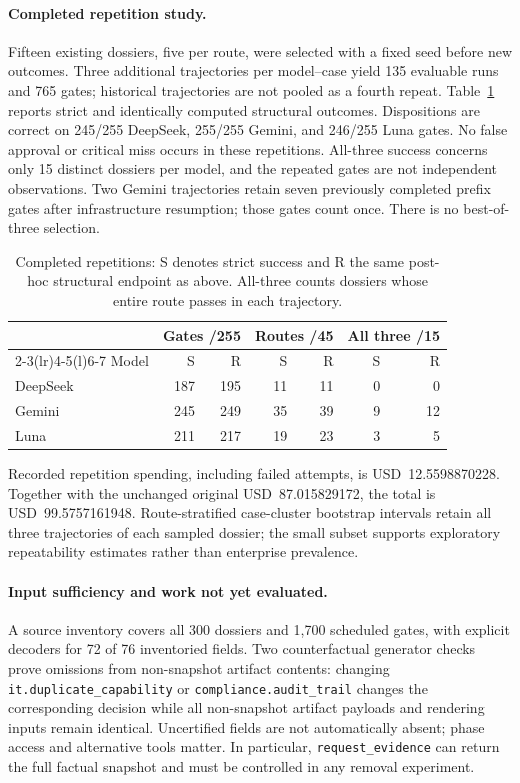 \paragraph{Completed repetition study.}
Fifteen existing dossiers, five per route, were selected with a fixed seed before new outcomes.
Three additional trajectories per model--case yield 135 evaluable runs and 765 gates; historical
trajectories are not pooled as a fourth repeat. Table~\ref{tab:bench-followup-repeats} reports
strict and identically computed structural outcomes. Dispositions are correct on 245/255
DeepSeek, 255/255 Gemini, and 246/255 Luna gates. No false approval or critical miss occurs in
these repetitions. All-three success concerns only 15 distinct dossiers per model, and the
repeated gates are not independent observations. Two Gemini trajectories retain seven previously
completed prefix gates after infrastructure resumption; those gates count once. There is no
best-of-three selection.

\begin{table}[!htb]
\centering\small
\caption{Completed repetitions: S denotes strict success and R the same post-hoc structural
endpoint as above. All-three counts dossiers whose entire route passes in each trajectory.}
\label{tab:bench-followup-repeats}
\begin{tabular}{@{}lrrrrrr@{}}
\toprule
& \multicolumn{2}{c}{Gates /255} & \multicolumn{2}{c}{Routes /45} & \multicolumn{2}{c}{All three /15}\\
\cmidrule(lr){2-3}\cmidrule(lr){4-5}\cmidrule(l){6-7}
Model & S & R & S & R & S & R\\
\midrule
DeepSeek & 187 & 195 & 11 & 11 & 0 & 0\\
Gemini & 245 & 249 & 35 & 39 & 9 & 12\\
Luna & 211 & 217 & 19 & 23 & 3 & 5\\
\bottomrule
\end{tabular}
\end{table}

Recorded repetition spending, including failed attempts, is USD~12.5598870228. Together with
the unchanged original USD~87.015829172, the total is USD~99.5757161948. Route-stratified
case-cluster bootstrap intervals retain all three trajectories of each sampled dossier;
the small subset supports exploratory repeatability estimates rather than enterprise prevalence.

\paragraph{Input sufficiency and work not yet evaluated.}
A source inventory covers all 300 dossiers and 1,700 scheduled gates, with explicit decoders
for 72 of 76 inventoried fields. Two counterfactual generator checks prove omissions from
non-snapshot artifact contents: changing \nolinkurl{it.duplicate_capability} or
\nolinkurl{compliance.audit_trail} changes the corresponding decision while all non-snapshot
artifact payloads and rendering inputs remain identical. Uncertified fields are not automatically absent;
phase access and alternative tools matter. In particular, \texttt{request\_evidence} can return
the full factual snapshot and must be controlled in any removal experiment.

